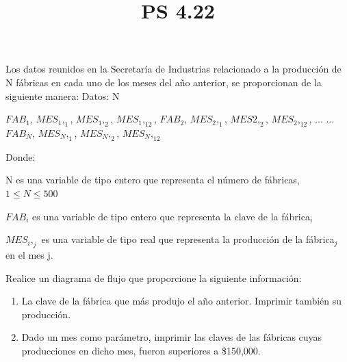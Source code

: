 \documentclass[11pt]{amsart}
\title{PS 4.22}
\begin{document}
\maketitle
 \noindent Los datos reunidos en la Secretaría de Industrias relacionado a la producción de N fábricas en cada uno de los meses del año anterior, se proporcionan de la siguiente manera:  \newline
Datos: N  \newline
\begin{center}
$FAB_1$, $MES_1,_1$, $MES_1,_2$, $MES_1,_{12}$,  \newline
$FAB_2$, $MES_2,_1$, $MES2,_2$, $MES_2,_{12}$,  \newline
...  \newline
... \newline
 \noindent$FAB_N$, $MES_N,_1$, $MES_N,_2$, $MES_N,_{12}$
\end{center} 

Donde:  

\setlength{\parindent}{1cm}
N \hspace{0.1cm} es una variable de tipo entero que representa el número de fábricas,      $1 \leq N \leq 500$ 

\setlength{\parindent}{1cm}
$FAB_i$ \hspace{0.5cm} es una variable de tipo entero que representa la clave de la fábrica$_i$ 

\setlength{\parindent}{1cm}
$MES_i,_j$  \hspace{0.5cm} es una variable de tipo real que representa la producción de la fábrica$_j$ en el mes j.  \newline

 \noindent Realice un diagrama de flujo que proporcione la siguiente información:
\begin{enumerate}
  \item[a)] La clave de la fábrica que más produjo el año anterior. Imprimir también su producción.
  \item[b)] Dado un mes como parámetro, imprimir las claves de las fábricas cuyas producciones en dicho mes, fueron superiores a \$150,000.
\end{enumerate}
\end{document}
